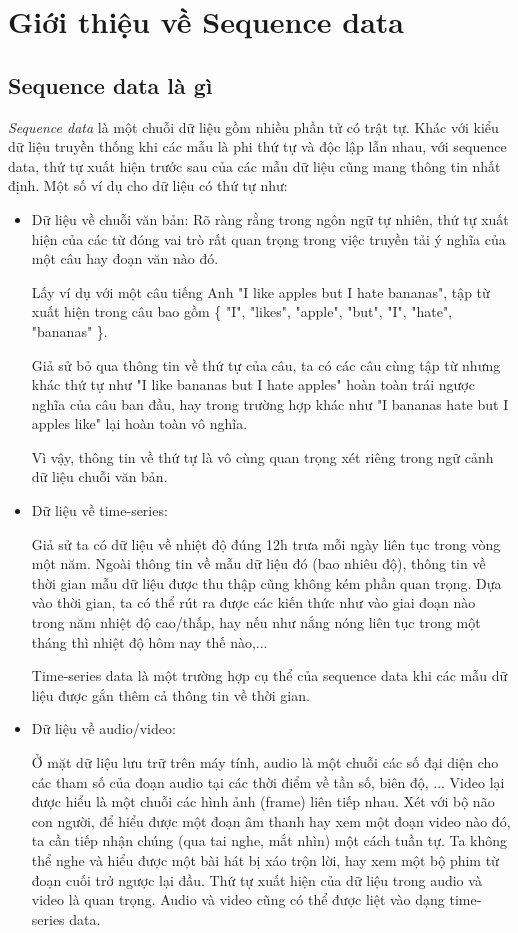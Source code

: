 \section{Giới thiệu về Sequence data}
\subsection{Sequence data là gì}
\hspace{\parindent} \textit{Sequence data} là một chuỗi dữ liệu gồm nhiều phần tử có trật tự. Khác với kiểu dữ liệu truyền thống khi các mẫu là phi thứ tự và độc lập lẫn nhau, với sequence data, thứ tự xuất hiện trước sau của các mẫu dữ liệu cũng mang thông tin nhất định. Một số ví dụ cho dữ liệu có thứ tự như:
\begin{itemize}
    \item Dữ liệu về chuỗi văn bản: Rõ ràng rằng trong ngôn ngữ tự nhiên, thứ tự xuất hiện của các từ đóng vai trò rất quan trọng trong việc truyền tải ý nghĩa của một câu hay đoạn văn nào đó. 
    
    Lấy ví dụ với một câu tiếng Anh  "I like apples but I hate bananas", tập từ xuất hiện trong câu bao gồm \{ "I", "likes", "apple", "but", "I", "hate", "bananas" \}. 
    
    Giả sử bỏ qua thông tin về thứ tự của câu, ta có các câu cùng tập từ nhưng khác thứ tự như "I like bananas but I hate apples" hoàn toàn trái ngược nghĩa của câu ban đầu, hay trong trường hợp khác như "I bananas hate but I apples like" lại hoàn toàn vô nghĩa. 
    
    Vì vậy, thông tin về thứ tự là vô cùng quan trọng xét riêng trong ngữ cảnh dữ liệu chuỗi văn bản.
    \item Dữ liệu về time-series: 
    
    Giả sử ta có dữ liệu về nhiệt độ đúng 12h trưa mỗi ngày liên tục trong vòng một năm. Ngoài thông tin về mẫu dữ liệu đó (bao nhiêu độ), thông tin về thời gian mẫu dữ liệu được thu thập cũng không kém phần quan trọng. Dựa vào thời gian, ta có thể rút ra được các kiến thức như vào giai đoạn nào trong năm nhiệt độ cao/thấp, hay nếu như nắng nóng liên tục trong một tháng thì nhiệt độ hôm nay thế nào,... 
    
    Time-series data là một trường hợp cụ thể của sequence data khi các mẫu dữ liệu được gắn thêm cả thông tin về thời gian.
    \item Dữ liệu về audio/video: 
    
    Ở mặt dữ liệu lưu trữ trên máy tính, audio là một chuỗi các số đại diện cho các tham số của đoạn audio tại các thời điểm về tần số, biên độ, ... Video lại được hiểu là một chuỗi các hình ảnh (frame) liên tiếp nhau. Xét với bộ não con người, để hiểu được một đoạn âm thanh hay xem một đoạn video nào đó, ta cần tiếp nhận chúng (qua tai nghe, mắt nhìn) một cách tuần tự. Ta không thể nghe và hiểu được một bài hát bị xáo trộn lời, hay xem một bộ phim từ đoạn cuối trở ngược lại đầu. Thứ tự xuất hiện của dữ liệu trong audio và video là quan trọng. Audio và video cũng có thể được liệt vào dạng time-series data.
\end{itemize}

